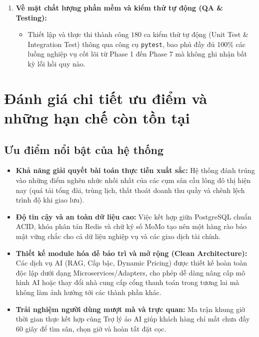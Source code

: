 \begin{enumerate}[label=\arabic*)]
\begin{itemize}
    \end{itemize}
    \item \textbf{Về mặt chất lượng phần mềm và kiểm thử tự động (QA \& Testing):}
    \begin{itemize}
        \item Thiết lập và thực thi thành công $180$ ca kiểm thử tự động (Unit Test \& Integration Test) thông qua công cụ \texttt{pytest}, bao phủ đầy đủ 100\% các luồng nghiệp vụ cốt lõi từ Phase 1 đến Phase 7 mà không ghi nhận bất kỳ lỗi hồi quy nào.
    \end{itemize}
\end{enumerate}

\section{Đánh giá chi tiết ưu điểm và những hạn chế còn tồn tại}
\label{sec:uunhuocdiem}

\subsection{Ưu điểm nổi bật của hệ thống}
\begin{itemize}[leftmargin=1.5cm]
    \item \textbf{Khả năng giải quyết bài toán thực tiễn xuất sắc:} Hệ thống đánh trúng vào những điểm nghẽn nhức nhối nhất của các cụm sân cầu lông đô thị hiện nay (quá tải tổng đài, trùng lịch, thất thoát doanh thu quầy và chênh lệch trình độ khi giao lưu).
    \item \textbf{Độ tin cậy và an toàn dữ liệu cao:} Việc kết hợp giữa PostgreSQL chuẩn ACID, khóa phân tán Redis và chữ ký số MoMo tạo nên một hàng rào bảo mật vững chắc cho cả dữ liệu nghiệp vụ và các giao dịch tài chính.
    \item \textbf{Thiết kế module hóa dễ bảo trì và mở rộng (Clean Architecture):} Các dịch vụ AI (RAG, Cấp bậc, Dynamic Pricing) được thiết kế hoàn toàn độc lập dưới dạng Microservices/Adapters, cho phép dễ dàng nâng cấp mô hình AI hoặc thay đổi nhà cung cấp cổng thanh toán trong tương lai mà không làm ảnh hưởng tới các thành phần khác.
    \item \textbf{Trải nghiệm người dùng mượt mà và trực quan:} Ma trận khung giờ thời gian thực kết hợp cùng Trợ lý ảo AI giúp khách hàng chỉ mất chưa đầy 60 giây để tìm sân, chọn giờ và hoàn tất đặt cọc.
\end{itemize}

